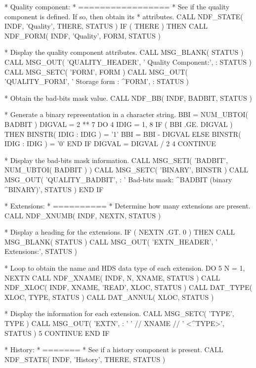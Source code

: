 \documentclass[twoside,11pt,nolof]{starlink}
\begin{document}
\begin{terminalv}
*  Quality component:
*  =================
*  See if the quality component is defined. If so, then obtain its
*  attributes.
      CALL NDF_STATE( INDF, 'Quality', THERE, STATUS )
      IF ( THERE ) THEN
         CALL NDF_FORM( INDF, 'Quality', FORM, STATUS )

*  Display the quality component attributes.
         CALL MSG_BLANK( STATUS )
         CALL MSG_OUT( 'QUALITY_HEADER', '   Quality Component:',
     :                 STATUS )
         CALL MSG_SETC( 'FORM', FORM )
         CALL MSG_OUT( 'QUALITY_FORM', '      Storage form :  ^FORM',
     :                  STATUS )

*  Obtain the bad-bits mask value.
         CALL NDF_BB( INDF, BADBIT, STATUS )

*  Generate a binary representation in a character string.
         BBI = NUM_UBTOI( BADBIT )
         DIGVAL = 2 ** 7
         DO 4 IDIG = 1, 8
            IF ( BBI .GE. DIGVAL ) THEN
               BINSTR( IDIG : IDIG ) = '1'
               BBI = BBI - DIGVAL
            ELSE
               BINSTR( IDIG : IDIG ) = '0'
            END IF
            DIGVAL = DIGVAL / 2
 4       CONTINUE

*  Display the bad-bits mask information.
         CALL MSG_SETI( 'BADBIT', NUM_UBTOI( BADBIT ) )
         CALL MSG_SETC( 'BINARY', BINSTR )
         CALL MSG_OUT( 'QUALITY_BADBIT',
     :   '      Bad-bits mask:  ^BADBIT (binary ^BINARY)', STATUS )
      END IF

*  Extensions:
*  ==========
*  Determine how many extensions are present.
      CALL NDF_XNUMB( INDF, NEXTN, STATUS )

*  Display a heading for the extensions.
      IF ( NEXTN .GT. 0 ) THEN
         CALL MSG_BLANK( STATUS )
         CALL MSG_OUT( 'EXTN_HEADER', '   Extensions:', STATUS )

*  Loop to obtain the name and HDS data type of each extension.
         DO 5 N = 1, NEXTN
            CALL NDF_XNAME( INDF, N, XNAME, STATUS )
            CALL NDF_XLOC( INDF, XNAME, 'READ', XLOC, STATUS )
            CALL DAT_TYPE( XLOC, TYPE, STATUS )
            CALL DAT_ANNUL( XLOC, STATUS )

*  Display the information for each extension.
            CALL MSG_SETC( 'TYPE', TYPE )
            CALL MSG_OUT( 'EXTN',
     :      '      ' // XNAME // '  <^TYPE>', STATUS )
 5       CONTINUE
      END IF

*  History:
*  =======
*  See if a history component is present.
      CALL NDF_STATE( INDF, 'History', THERE, STATUS )


\end{terminalv}
\end{document}
